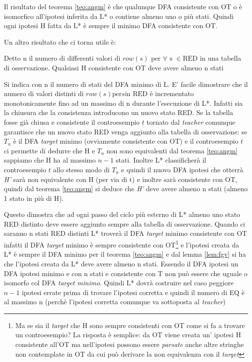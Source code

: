 Il risultato del teorema \ref{teo:angm} è che qualunque DFA consistente con OT o è isomorfico all'ipotesi inferita da L* o contiene almeno uno o più stati. Quindi ogni ipotesi \ac{H} fatta da L* è sempre il minimo DFA consistente con OT.

Un altro risultato che ci torna utile è:
\begin{lemma}
\label{lem:fgv}
Detto n il numero di differenti valori di $row(s) \text{ per } \forall \text{ s } \in \text{RED}$ in una tabella di osservazione. Qualsiasi \ac{H} consistente con OT deve avere almeno n stati
\end{lemma}
Si indica con n il numero di stati del DFA minimo di \ac{L}. E' facile dimostrare che il numero di valori distinti di $row(s) \text{per} s \text{in RED} $ è incrementato monotonicamente fino ad un massimo di n durante l'esecuzione di L*. Infatti sia la chiusura che la consistenza introducono un nuovo stato RED. Se la tabella fosse già chiusa e consistente il controesempio $t$ tornato dal \textit{teacher} comunque garantisce che un nuovo stato RED venga aggiunto alla tabella di osservazione: se $T_u$ è il DFA \textit{target} minimo (ovviamente consistente con OT) e il controesempio $t$ ci permette di dedurre che \ac{H} e  $T_u$  non sono equivalenti dal teorema \ref{teo:angm} sappiamo che \ac{H} ha al massimo $n-1$ stati. Inoltre L* classificherà il controesempio $t$ allo stesso modo di $T_u$ e quindi il nuovo DFA ipotesi che otterrà \textit{H'} sarà non equivalente con \ac{H} (per via di t) e inoltre sarà consistente con OT, quindi dal teorema \ref{teo:angm}  si deduce che \textit{H'} deve avere almeno n stati (almeno 1 stato in più di \ac{H}).

Questo dimostra che ad ogni passo del ciclo più esterno di L* almeno uno stato RED distinto deve essere aggiunto sempre alla tabella di osservazione. Quando ci saranno n stati RED distinti L* troverà il DFA \textit{target} minimo consistente con OT infatti il DFA \textit{target} minimo è sempre consistente con OT\footnote{Ma se sia il \textit{target} che \ac{H} sono sempre consistenti con OT come si fa a trovare un controesempio? La risposta è semplice: da OT viene creata un' ipotesi \ac{H} consistente all'OT ma nell'ipotesi possono essere \textit{parsate} anche altre stringhe non contemplate in OT da cui può derivare la non equivalenza con il \textit{target}} e l'ipotesi creata da L* è sempre il DFA minimo per il teorema \ref{teo:angm} e dal lemma \ref{lem:fgv} si ha che l'ipotesi creata da L* deve avere almeno n stati.
Essendo il DFA ipotesi un DFA ipotesi minimo e con n stati e consistente con T non può essere che uguale o isomorfo col DFA \textit{target minimo}.  Quindi L* dovrà costruire nel caso peggiore $n-1$ ipotesi errate prima di trovare l'ipotesi corretta e quindi il numero di \ac{EQ} è al massimo n (perchè l'ipotesi corretta comunque va sottoposta al \textit{teacher})

